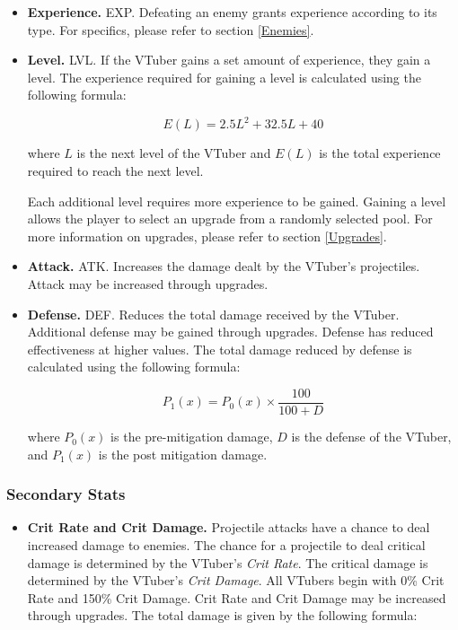 \documentclass[10pt, a4paper]{article}
\begin{document}
\begin{multicols}{2}
\begin{itemize}
  	\item \textbf{Experience.} EXP. Defeating an enemy grants experience according to its type. For specifics, please refer to section \ref{Enemies}. 
  	
  	\item \textbf{Level.} LVL. If the VTuber gains a set amount of experience, they gain a level. The experience required for gaining a level is calculated using the following formula:
  	
  	\[E(L) = 2.5L^2 + 32.5L + 40\]
  	
  	where $L$ is the next level of the VTuber and $E(L)$ is the total experience required to reach the next level.
  	
  	Each additional level requires more experience to be gained. Gaining a level allows the player to select an upgrade from a randomly selected pool. For more information on upgrades, please refer to section \ref{Upgrades}.
  	
  	\item \textbf{Attack.} ATK. Increases the damage dealt by the VTuber's projectiles. Attack may be increased through upgrades.

  	\item\textbf{Defense.} DEF. Reduces the total damage received by the VTuber. Additional defense may be gained through upgrades. Defense has reduced effectiveness at higher values. The total damage reduced by defense is calculated using the following formula:
  	
  	\[P_1(x) = P_0(x) \times \frac{100}{100+D}\]
  	
  	where $P_0(x)$ is the pre-mitigation damage, $D$ is the defense of the VTuber, and $P_1(x)$ is the post mitigation damage.
  	
  	\end{itemize}
  	
  	\subsubsection{Secondary Stats}
  	
  	\begin{itemize}
  	 \item \textbf{Crit Rate and Crit Damage.} Projectile attacks have a chance to deal increased damage to enemies. The chance for a projectile to deal critical damage is determined by the VTuber's \textit{Crit Rate}. The critical damage is determined by the VTuber's \textit{Crit Damage}. All VTubers begin with 0\% Crit Rate and 150\% Crit Damage. Crit Rate and Crit Damage may be increased through upgrades. The total damage is given by the following formula:


\end{itemize}
\end{multicols}
\end{document}
